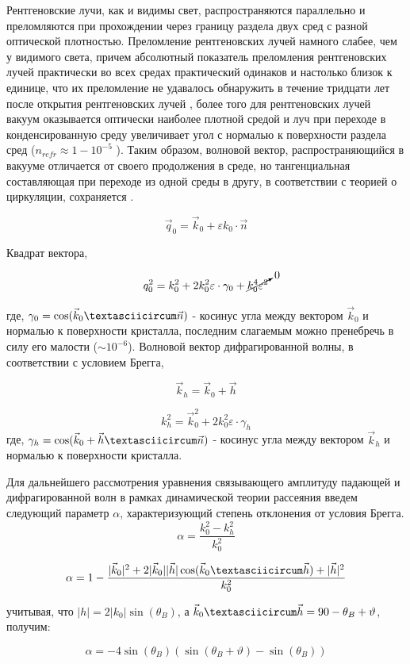 Рентгеновские лучи, как и видимы свет, распространяются параллельно и преломляются при
прохождении через границу раздела двух сред с разной оптической плотностью.
 Преломление рентгеновских лучей намного слабее, чем у видимого света, причем
 абсолютный показатель преломления рентгеновских лучей практически во всех средах
 практический одинаков и настолько близок к единице, что их преломление не удавалось обнаружить
 в течение тридцати лет после открытия рентгеновских лучей \cite{fetisov2007}, более того
 для рентгеновских лучей вакуум оказывается оптически наиболее плотной средой и луч
 при переходе в конденсированную среду увеличивает угол с нормалью к поверхности раздела сред ($n_{refr} \approx 1-10^{-5}$ ).
 Таким образом, волновой вектор, распространяющийся в вакууме отличается от своего продолжения в
 среде, но тангенциальная составляющая при переходе из одной среды в другу, в соответствии с теорией о циркуляции, сохраняется \cite{landau_8_1992}.

 \begin{equation}
   \vec{q}_0 = \vec{k}_0 + \varepsilon k_0 \cdot \vec{n}
  \end{equation}

Квадрат вектора,

\begin{equation}
   q_0^2 = k_0^2 + 2k_0^2 \varepsilon \cdot \gamma_0 + \cancelto{0}{k_0^4  \varepsilon^2}
   \label{eq:k_0_squred}
 \end{equation}

  где, $\gamma_0 = \cos(\vec{k}_0 \textasciicircum \vec{n})$ - косинус угла между вектором $\vec{k}_0$ и нормалью к поверхности кристалла,
  последним слагаемым можно пренебречь в силу его малости ($\sim 10^{-6}$).
  Волновой вектор дифрагированной волны, в соответствии с условием Брегга,

  $$\vec{k}_h = \vec{k}_0+\vec{h}$$

  \begin{equation}
     k_h^2 = \vec{k}_0^2+2k_0^2 \varepsilon \cdot \gamma_h
     \label{eq:k_h_squred}
   \end{equation}
   где, $\gamma_h = \cos(\vec{k}_0+ \vec{h} \textasciicircum \vec{n})$ - косинус угла между вектором $\vec{k}_h$ и нормалью к поверхности кристалла.

Для дальнейшего рассмотрения уравнения связывающего амплитуду падающей и дифрагированной волн в рамках
динамической теории рассеяния введем следующий параметр $\alpha$, характеризующий степень отклонения от условия Брегга.
\begin{equation}
   \alpha = \frac{k_0^2-k_h^2}{k_0^2}
   \label{eq:alpha}
\end{equation}


$$  \alpha = 1 - \frac{|\vec{k}_0|^2+2|\vec{k}_0||\vec{h}|\cos(\vec{k}_0 \textasciicircum \vec{h})+|\vec{h}|^2}{k_0^2}$$

учитывая, что $ |h| = 2|k_0| \sin(\theta_B) $, а $\vec{k}_0 \textasciicircum \vec{h} = 90-\theta_B+\vartheta$, получим:

\begin{equation}
   \alpha = -4\sin(\theta_B)(\sin(\theta_B+\vartheta)-\sin(\theta_B))
\end{equation}
